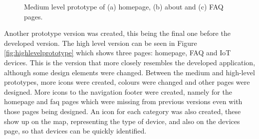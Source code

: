 \begin{figure}
\begin{subfigure}{0.33\textwidth}
        \caption{}
        \label{fig:mediumfaq}
    \end{subfigure}%
    \caption{Medium level prototype of (a) homepage, (b) about and (c) FAQ pages.}
    \label{fig:mediumlevelprototype}
\end{figure}

Another prototype version was created, this being the final one before
the developed version. The high level version can be seen in Figure \ref{fig:highlevelprototype}
which shows three pages: homepage, FAQ and IoT devices. This is the version
that more closely resembles the developed application, although some design
elements were changed. Between the medium and high-level prototypes, more icons
were created, colours were changed and other pages were designed. More icons
to the navigation footer were created, namely for the homepage and faq pages
which were missing from previous versions even with those pages being designed.
An icon for each category was also created, these show up on the map, representing
the type of device, and also on the devices page, so that devices can be quickly
identified.

